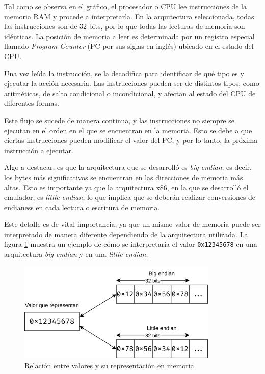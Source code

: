 Tal como se observa en el gráfico, el procesador o CPU lee instrucciones de la memoria RAM y procede a interpretarla. En la arquitectura seleccionada, todas las instrucciones son de 32 bits, por lo que todas las lecturas de memoria son idénticas. La posición de memoria a leer es determinada por un registro especial llamado \textit{Program Counter} (PC por sus siglas en inglés) ubicado en el estado del CPU.

Una vez leída la instrucción, se la decodifica para identificar de qué tipo es y ejecutar la acción necesaria. Las instrucciones pueden ser de distintos tipos, como aritméticas, de salto condicional o incondicional, y afectan al estado del CPU de diferentes formas.

Este flujo se sucede de manera continua, y las instrucciones no siempre se ejecutan en el orden en el que se encuentran en la memoria. Esto se debe a que ciertas instrucciones pueden modificar el valor del PC, y por lo tanto, la próxima instrucción a ejecutar.

Algo a destacar, es que la arquitectura que se desarrolló es \textit{big-endian}, es decir, los bytes más significativos se encuentran en las direcciones de memoria más altas. Esto es importante ya que la arquitectura x86, en la que se desarrolló el emulador, es \textit{little-endian}, lo que implica que se deberán realizar conversiones de endianess en cada lectura o escritura de memoria.

Este detalle es de vital importancia, ya que un mismo valor de memoria puede ser interpretado de manera diferente dependiendo de la arquitectura utilizada. La figura \ref{fig:endianess} muestra un ejemplo de cómo se interpretaría el valor \texttt{0x12345678} en una arquitectura \textit{big-endian} y en una \textit{little-endian}.

\begin{figure}[htbp]
	\centering
	\includegraphics[width=0.85\textwidth]{./Figures/endianess}
	\caption{Relación entre valores y su representación en memoria.}
	\label{fig:endianess}
\end{figure}

